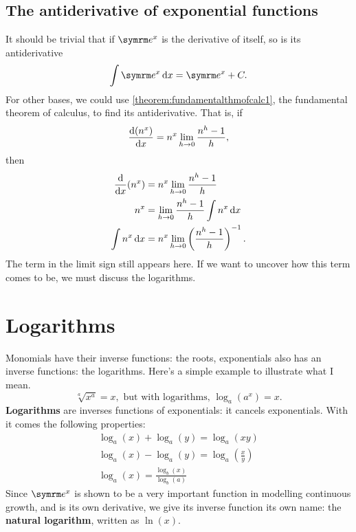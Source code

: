 \subsection{The antiderivative of exponential functions}

It should be trivial that if $\e^x$ is the derivative of itself, so is its antiderivative
\begin{equation}
    \int \e^x \odif{x} = \e^x + C.
\end{equation}
For other bases, we could use \cref{theorem:fundamentalthmofcalc1}, the fundamental theorem of calculus, to find its antiderivative. That is, if
\begin{equation*}
    \odv{(n^x)}{x} = n^x\lim_{h \appr 0}\frac{n^h - 1}{h},
\end{equation*}
then
\begin{align*}
    \odv*{(n^x)}{x} &= n^x\lim_{h \appr 0}\frac{n^h - 1}{h} \\
    n^x &= \lim_{h \appr 0}\frac{n^h - 1}{h}\int n^x\odif{x} \\
    \int n^x\odif{x} &= n^x\lim_{h \appr 0}\left(\frac{n^h - 1}{h}\right)^{-1}.
\end{align*}
The term in the limit sign still appears here. If we want to uncover how this term comes to be, we must discuss the logarithms.

\section{Logarithms}

Monomials have their inverse functions: the roots, exponentials also has an inverse functions: the logarithms. Here's a simple example to illustrate what I mean.
\begin{equation*}
    \sqrt[a]{x^a} = x, \textrm{ but with logarithms, } \log_{a}(a^x) = x.
\end{equation*}
\textbf{Logarithms} are inverses functions of exponentials: it cancels exponentials. With it comes the following properties:
\begin{gather}
    \log_a(x) + \log_a(y) = \log_a(xy) \\
    \log_a(x) - \log_a(y) = \log_a\left(\frac{x}{y}\right) \\
    \log_a(x) = \frac{\log_b(x)}{\log_b(a)}
\end{gather}
Since $\e^x$ is shown to be a very important function in modelling continuous growth, and is its own derivative, we give its inverse function its own name: the \textbf{natural logarithm}, written as $\ln(x)$.

